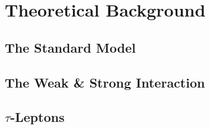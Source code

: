 \chapter{Theoretical Background}
\label{sec:theory}

\section{The Standard Model}

\section{The Weak \& Strong Interaction}

\section{$\tau$-Leptons}

